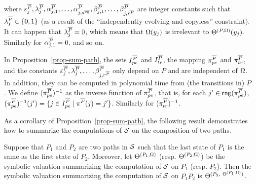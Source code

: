 \begin{proposition}
\begin{itemize}
{\[\begin{array}{l}
\end{array}
\]} 
where $\varepsilon^{\overline{P}}_j,\lambda^{\overline{P}}_j, \alpha^{\overline{P}}_{j,1},\dots,\alpha^{\overline{P}}_{j, s^{\overline{p_0}}}, \beta^{\overline{P}}_{j,1},\dots,\beta^{\overline{P}}_{j,r^{\overline{P}}}$ are integer constants such that $\lambda^{\overline{P}}_{j} \in \{0,1\}$ (as a result of the ``independently evolving and copyless'' constraint).  It can happen that $\lambda^{\overline{P}}_j =0$,  which means that $\Omega(y_j)$ is irrelevant to $\Theta^{(P,\Omega)}(y_j)$. Similarly for $\alpha^{\overline{P}}_{j,1}=0$, and so on.
\end{itemize}
\end{proposition}
In Proposition~\ref{prop-sum-path}, the sets $I^{\overline{P}}_{pe}$ and $I^{\overline{P}}_{tr}$, the mapping $\pi^{\overline{P}}_{pe}$ and $\pi^{\overline{P}}_{tr}$, and the constants $\varepsilon^{\overline{P}}_j,\lambda^{\overline{P}}_j, \dots, \beta^{\overline{P}}_{j,r^{\overline{P}}}$ only depend on $P$ and are independent of $\Omega$. In addition, they can be computed in polynomial time from (the transitions in) $P$.
We define $(\pi^{\overline{P}}_{pe})^{-1}$ as the inverse function of $\pi^{\overline{P}}_{pe}$, that is, for each $j' \in \mathsf{rng}(\pi^{\overline{P}}_{pe})$, $(\pi^{\overline{P}}_{pe})^{-1}(j')=\{j \in I^{\overline{P}}_{pe}  \mid \pi^{\overline{P}}(j)= j'\}$. Similarly for $(\pi^{\overline{P}}_{tr})^{-1}$.

As a corollary of Proposition~\ref{prop-sum-path}, the following result demonstrates how to summarize the computations of ${\mathcal{S} }$ on the composition of two paths.

\begin{corollary}\label{cor-comp-two-paths}
Suppose that $P_1$ and $P_2$ are two paths in ${\mathcal{S} }$ such that the last state of $P_1$ is the same as the first state of $P_2$. Moreover, let $\Theta^{(P_1, \Omega)}$ (resp. $\Theta^{(P_2, \Omega)}$) be the symbolic valuation summarizing the computation of ${\mathcal{S} }$ on $P_1$ (resp. $P_2$). Then the symbolic valuation summarizing the computation of ${\mathcal{S} }$ on $P_1 P_2$ is $\sumf^{(P_2,\ \sumf^{(P_1,\initval)})}$.
\end{corollary}

